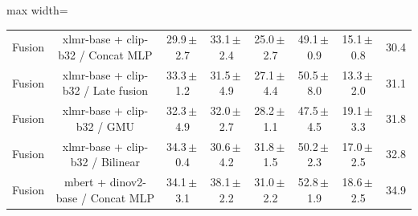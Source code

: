 \begin{table}[t]
\begin{adjustbox}{max width=\textwidth}
\begin{tabular}{lccccccc}
Fusion & xlmr-base + clip-b32 / Concat MLP & 29.9\,$\pm$\,2.7 & 33.1\,$\pm$\,2.4 & 25.0\,$\pm$\,2.7 & 49.1\,$\pm$\,0.9 & 15.1\,$\pm$\,0.8 & 30.4 \\
Fusion & xlmr-base + clip-b32 / Late fusion & 33.3\,$\pm$\,1.2 & 31.5\,$\pm$\,4.9 & 27.1\,$\pm$\,4.4 & 50.5\,$\pm$\,8.0 & 13.3\,$\pm$\,2.0 & 31.1 \\
Fusion & xlmr-base + clip-b32 / GMU & 32.3\,$\pm$\,4.9 & 32.0\,$\pm$\,2.7 & 28.2\,$\pm$\,1.1 & 47.5\,$\pm$\,4.5 & 19.1\,$\pm$\,3.3 & 31.8 \\
Fusion & xlmr-base + clip-b32 / Bilinear & 34.3\,$\pm$\,0.4 & 30.6\,$\pm$\,4.2 & 31.8\,$\pm$\,1.5 & 50.2\,$\pm$\,2.3 & 17.0\,$\pm$\,2.5 & 32.8 \\
Fusion & mbert + dinov2-base / Concat MLP & 34.1\,$\pm$\,3.1 & 38.1\,$\pm$\,2.2 & 31.0\,$\pm$\,2.2 & 52.8\,$\pm$\,1.9 & 18.6\,$\pm$\,2.5 & 34.9 \\
\bottomrule
\end{tabular}
\end{adjustbox}
\end{table}
